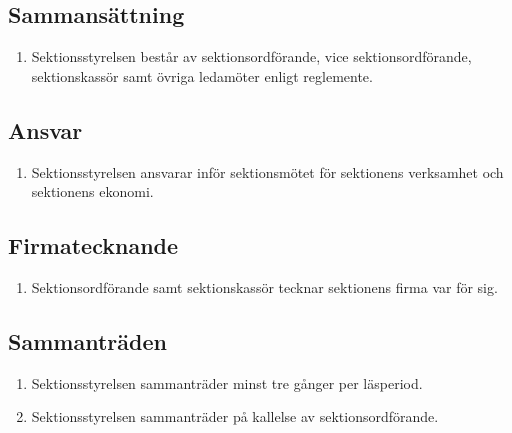 \documentclass[11pt,a4paper]{article}
\begin{document}
\subsection{Sammansättning}

\begin{enumerate}[\thesubsection .1]

  \item Sektionsstyrelsen består av sektionsordförande, vice sektionsordförande, sektionskassör samt övriga ledamöter enligt reglemente.
\end{enumerate}

\subsection{Ansvar}

\begin{enumerate}[\thesubsection .1]

  \item Sektionsstyrelsen ansvarar inför sektionsmötet för sektionens verksamhet och sektionens ekonomi.

\end{enumerate}

\subsection{Firmatecknande}

\begin{enumerate}[\thesubsection .1]

  \item Sektionsordförande samt sektionskassör tecknar sektionens
  firma var för sig.

\end{enumerate}

\subsection{Sammanträden}

\begin{enumerate}[\thesubsection .1]

  \item  Sektionsstyrelsen sammanträder minst tre gånger per läsperiod.

  \item Sektionsstyrelsen sammanträder på kallelse av sektionsordförande.

\end{enumerate}
\end{document}
